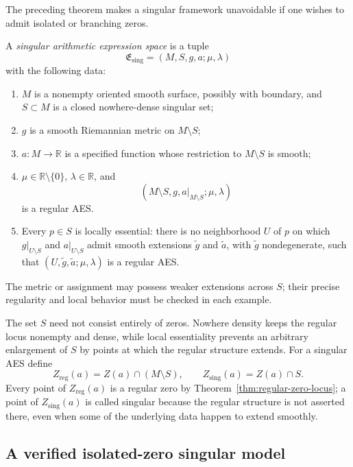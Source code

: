The preceding theorem makes a singular framework unavoidable if one wishes to
admit isolated or branching zeros.

\begin{definition}\label{def:singular-aes}
A \emph{singular arithmetic expression space} is a tuple
\[
 \mathfrak E_{\mathrm{sing}}=(M,S,g,a;\mu,\lambda)
\]
with the following data:
\begin{enumerate}
\item \(M\) is a nonempty oriented smooth surface, possibly with boundary, and
      \(S\subset M\) is a closed nowhere-dense singular set;
\item \(g\) is a smooth Riemannian metric on \(M\setminus S\);
\item \(a:M\to\mathbb R\) is a specified function whose restriction to
      \(M\setminus S\) is smooth;
\item \(\mu\in\mathbb R\setminus\{0\}\), \(\lambda\in\mathbb R\), and
      \[
      (M\setminus S,g,a|_{M\setminus S};\mu,\lambda)
      \]
      is a regular AES.
\item Every \(p\in S\) is locally essential: there is no neighborhood \(U\) of
      \(p\) on which \(g|_{U\setminus S}\) and \(a|_{U\setminus S}\) admit
      smooth extensions \(\widetilde g\) and \(\widetilde a\), with
      \(\widetilde g\) nondegenerate, such that
      \((U,\widetilde g,\widetilde a;\mu,\lambda)\) is a regular AES.
\end{enumerate}
The metric or assignment may possess weaker extensions across \(S\); their precise
regularity and local behavior must be checked in each example.
\end{definition}

The set \(S\) need not consist entirely of zeros.  Nowhere density keeps the regular
locus nonempty and dense, while local essentiality prevents an arbitrary enlargement
of \(S\) by points at which the regular structure extends.  For a singular AES define
\begin{equation}\label{eq:regular-singular-zero-parts}
 Z_{\mathrm{reg}}(a)=Z(a)\cap(M\setminus S),
 \qquad
 Z_{\mathrm{sing}}(a)=Z(a)\cap S.
\end{equation}
Every point of \(Z_{\mathrm{reg}}(a)\) is a regular zero by
Theorem~\ref{thm:regular-zero-locus}; a point of
\(Z_{\mathrm{sing}}(a)\) is called singular because the regular structure is not
asserted there, even when some of the underlying data happen to extend smoothly.

\subsection{A verified isolated-zero singular model}

